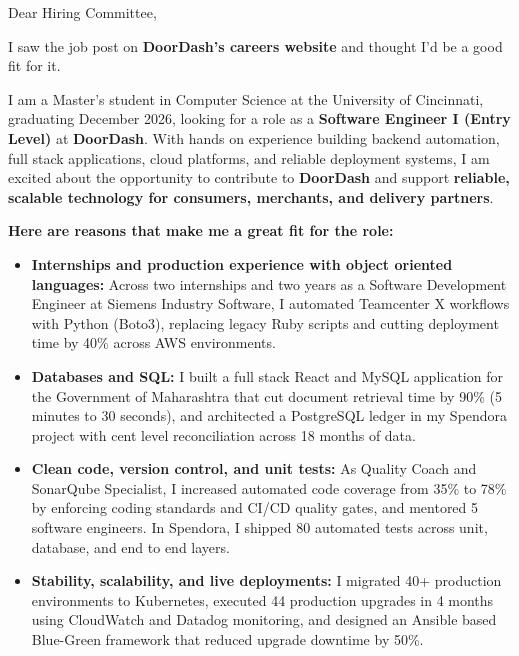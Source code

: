 \documentclass[11pt]{letter}
\date{}
\begin{document}
\begin{letter}{}

\opening{Dear Hiring Committee,}

I saw the job post on \textbf{DoorDash's careers website} and thought I'd be a good fit for it.

I am a Master's student in Computer Science at the University of Cincinnati, graduating December 2026, looking for a role as a \textbf{Software Engineer I (Entry Level)} at \textbf{DoorDash}. With hands on experience building backend automation, full stack applications, cloud platforms, and reliable deployment systems, I am excited about the opportunity to contribute to \textbf{DoorDash} and support \textbf{reliable, scalable technology for consumers, merchants, and delivery partners}.

\textbf{Here are reasons that make me a great fit for the role:}

\begin{itemize}[leftmargin=*, itemsep=0.45em]
    \item \textbf{Internships and production experience with object oriented languages:} Across two internships and two years as a Software Development Engineer at Siemens Industry Software, I automated Teamcenter X workflows with Python (Boto3), replacing legacy Ruby scripts and cutting deployment time by 40\% across AWS environments.

    \item \textbf{Databases and SQL:} I built a full stack React and MySQL application for the Government of Maharashtra that cut document retrieval time by 90\% (5 minutes to 30 seconds), and architected a PostgreSQL ledger in my Spendora project with cent level reconciliation across 18 months of data.

    \item \textbf{Clean code, version control, and unit tests:} As Quality Coach and SonarQube Specialist, I increased automated code coverage from 35\% to 78\% by enforcing coding standards and CI/CD quality gates, and mentored 5 software engineers. In Spendora, I shipped 80 automated tests across unit, database, and end to end layers.

    \item \textbf{Stability, scalability, and live deployments:} I migrated 40+ production environments to Kubernetes, executed 44 production upgrades in 4 months using CloudWatch and Datadog monitoring, and designed an Ansible based Blue-Green framework that reduced upgrade downtime by 50\%.


\end{itemize}
\end{letter}
\end{document}
